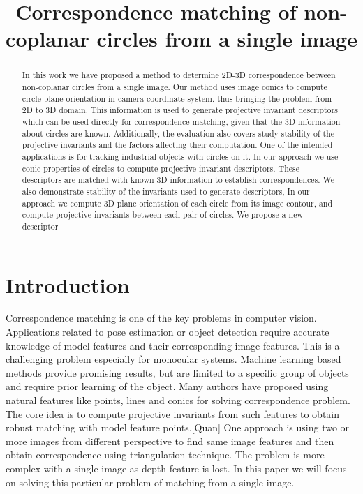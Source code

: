 \documentclass{bmvc2k}
\title{Correspondence matching of non-coplanar circles from a single image}
\begin{document}
\maketitle

\begin{abstract}
In this work we have proposed a method to determine 2D-3D correspondence between non-coplanar circles from a single image.
Our method uses image conics to compute circle plane orientation in camera coordinate system, thus bringing the problem from 2D to 3D domain. This information is used to generate projective invariant descriptors which can be used directly for correspondence matching, given that the 3D information about circles are known. Additionally, the evaluation also covers study stability of the projective invariants and the factors affecting their computation. One of the intended applications is for tracking industrial objects with circles on it. In our approach we use conic properties of circles to compute projective invariant descriptors. These descriptors are matched with known 3D information to establish correspondences. We also demonstrate stability of the invariants used to generate descriptors,   
In our approach we compute 3D plane orientation of each circle from its image contour, and compute projective invariants between each pair of circles. We propose a new descriptor 

\end{abstract}

\section{Introduction}
\label{sec:intro}
Correspondence matching is one of the key problems in computer vision. Applications related to pose estimation or object detection require accurate knowledge of model features and their corresponding image features. This is a challenging problem especially for monocular systems. Machine learning based methods \cite{Hartley00} provide promising results, but are limited to a specific group of objects and require prior learning of the object. Many authors have proposed using natural features like points, lines and conics for solving correspondence problem. The core idea is to compute projective invariants from such features to obtain robust matching with model feature points.[Quan] One approach is using two or more images from different perspective to find same image features and then obtain correspondence using triangulation technique. The problem is more complex with a single image as depth feature is lost. In this paper we will focus on solving this particular problem of matching from a single image. 
\end{document}
